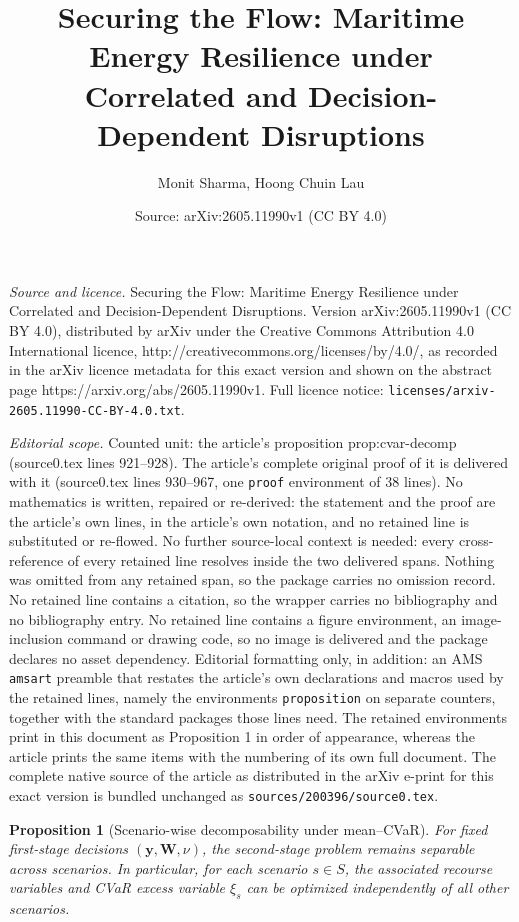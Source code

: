 \documentclass[10pt,a4paper]{amsart}
\title{Securing the Flow: Maritime Energy Resilience under Correlated and Decision-Dependent Disruptions}
\author{Monit Sharma, Hoong Chuin Lau}
\date{Source: arXiv:2605.11990v1 (CC BY 4.0)}
\newtheorem{proposition}{Proposition}
\begin{document}
\maketitle

\noindent\emph{Source and licence.} Securing the Flow: Maritime Energy Resilience under Correlated and Decision-Dependent Disruptions. Version arXiv:2605.11990v1 (CC BY 4.0), distributed by arXiv under the Creative Commons Attribution 4.0 International licence, http://creativecommons.org/licenses/by/4.0/, as recorded in the arXiv licence metadata for this exact version and shown on the abstract page https://arxiv.org/abs/2605.11990v1. Full licence notice: \texttt{licenses/arxiv-2605.11990-CC-BY-4.0.txt}.\par\smallskip

\noindent\textit{Editorial scope.} Counted unit: the article's proposition prop:cvar-decomp (source0.tex lines 921--928). The article's complete original proof of it is delivered with it (source0.tex lines 930--967, one \texttt{proof} environment of 38 lines). No mathematics is written, repaired or re-derived: the statement and the proof are the article's own lines, in the article's own notation, and no retained line is substituted or re-flowed.  No further source-local context is needed: every cross-reference of every retained line resolves inside the two delivered spans.  Nothing was omitted from any retained span, so the package carries no omission record.  No retained line contains a citation, so the wrapper carries no bibliography and no bibliography entry.  No retained line contains a figure environment, an image-inclusion command or drawing code, so no image is delivered and the package declares no asset dependency.  Editorial formatting only, in addition: an AMS \texttt{amsart} preamble that restates the article's own declarations and macros used by the retained lines, namely the environments \texttt{proposition} on separate counters, together with the standard packages those lines need.  The retained environments print in this document as Proposition 1 in order of appearance, whereas the article prints the same items with the numbering of its own full document.  The complete native source of the article as distributed in the arXiv e-print for this exact version is bundled unchanged as \texttt{sources/200396/source0.tex}.
\begin{proposition}[Scenario-wise decomposability under mean--CVaR]
\label{prop:cvar-decomp}
For fixed first-stage decisions $(\mathbf{y}, \mathbf{W}, \nu)$, the
second-stage problem remains separable across scenarios. In particular,
for each scenario $s \in S$, the associated recourse variables and CVaR
excess variable $\xi_s$ can be optimized independently of all other
scenarios.
\end{proposition}
\end{document}
